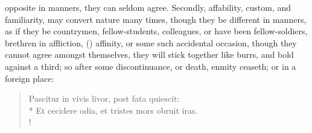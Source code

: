 {opposite in manners, they can seldom agree. Secondly, affability,
custom, and familiarity, may convert nature many times, though they be
different in manners, as if they be countrymen, fellow-students,
colleagues, or have been fellow-soldiers, brethren in affliction,
() affinity, or some such accidental occasion, though they
cannot agree amongst themselves, they will stick together like burrs,
and bold against a third; so after some discontinuance, or death,
enmity ceaseth; or in a foreign place:
%
\begin{latin}
\begin{verse}
Pascitur in vivis livor, post fata quiescit:\\*
Et cecidere odia, et tristes mors obruit iras.\\!
\end{verse}
\end{latin}

}
